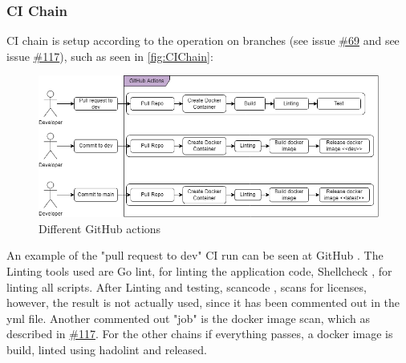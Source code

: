 \subsubsection{CI Chain}
CI chain is setup according to the operation on branches (see issue \href{https://github.com/DevelOpsITU/MiniTwit/issues/69}{\#69} and see issue \href{https://github.com/DevelOpsITU/MiniTwit/issues/117}{\#117}), such as seen in \autoref{fig:CIChain}: 
\begin{figure}[H]
    \centering
    \includegraphics[width=\linewidth]{images/diagrams/CI_Chain.png}
    \caption{Different GitHub actions}
    \label{fig:CIChain}
\end{figure}
%    
%    

An example of the "pull request to dev" CI run can be seen at GitHub \cite{ci_run_example_1}.
The Linting tools used are Go lint\cite{golinter.sh}, for linting the application code, Shellcheck \cite{shellchecker.sh}, for linting all scripts. After Linting and testing, scancode \cite{scancode_dockerfile}, scans for licenses, however, the result is not actually used, since it has been commented out in the yml file\cite{pullreq_to_dev_yml}. Another commented out "job" is the docker image scan, which as described in \href{https://github.com/DevelOpsITU/MiniTwit/issues/117}{\#117}. For the other chains if everything passes, a docker image is build, linted using hadolint\cite{hadolint} and released. \\

